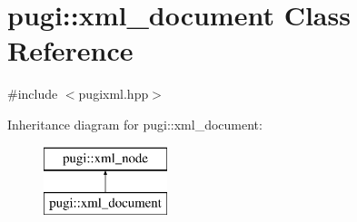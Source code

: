 \hypertarget{classpugi_1_1xml__document}{\section{pugi\-:\-:xml\-\_\-document Class Reference}
\label{classpugi_1_1xml__document}
}


{\ttfamily \#include $<$pugixml.\-hpp$>$}

Inheritance diagram for pugi\-:\-:xml\-\_\-document\-:\begin{figure}[H]
\begin{center}
\leavevmode
\includegraphics[height=2.000000cm]{classpugi_1_1xml__document}
\end{center}
\end{figure}
